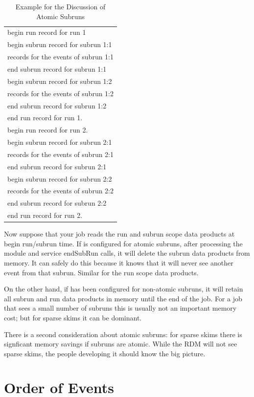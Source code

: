 \begin{table}
\begin{center}
\caption[Example For Discussion of Atomic Subruns]{Example for the Discussion of Atomic Subruns}
\label{tab:atomicsubruns}
\begin{tabular}{l}\hline
  begin run record for run 1 \\
  begin subrun record for subrun 1:1 \\
  records for the events of subrun 1:1 \\
  end subrun record for subrun 1:1 \\
   begin subrun record for subrun 1:2 \\
   records for the events of subrun 1:2 \\
   end subrun record for subrun 1:2 \\
   end run record for run 1. \\ \hline
   begin run record for run 2. \\
   begin subrun record for subrun 2:1 \\
   records for the events of subrun 2:1 \\
   end subrun record for subrun 2:1 \\
   begin subrun record for subrun 2:2 \\
   records for the events of subrun 2:2 \\
   end subrun record for subrun 2:2 \\
   end run record for run 2. \\
   \hline
  \end{tabular}
\end{center}
\end{table}

Now suppose that your job reads the run and subrun scope data products at begin run/subrun time.
If \art is configured for atomic subruns, after processing the module and service
{\code endSubRun} calls, it will delete the subrun data products from memory. It can safely do this
because it knows that it will never see another event from that subrun.
Similar for the run scope data products.

On the other hand, if \art has been configured for non-atomic subruns, it will retain all subrun
and run data products in memory until the end of the job.
For a job that sees a small number of subruns this is usually not an important memory cost; but
for sparse skims it can be dominant.


There is a second consideration about atomic subruns:
for sparse skims there is signficant memory savings if subruns are atomic.
While the RDM will not see sparse skims, the people developing it should know the big picture.


\section{Order of Events}

\clearpage
{}
{}
\printbibliography


